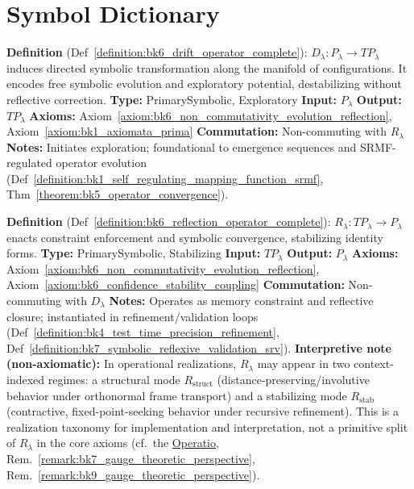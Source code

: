\clearpage
{}
\chapter{Symbol Dictionary}
\label{sec:appA_symbol_dictionary}

\begin{description}[leftmargin=2.5cm, style=nextline]

\item[\textbf{Symbolic Drift Operator} \hfill \( D_{\lambda} \)] 
\label{dict:appA_symbolic_drift_operator}
\textbf{Definition} (Def~\ref{definition:bk6_drift_operator_complete}): \( D_{\lambda} : P_\lambda \rightarrow T P_\lambda \) induces directed symbolic transformation along the manifold of configurations. It encodes free symbolic evolution and exploratory potential, destabilizing without reflective correction.
\textbf{Type:} PrimarySymbolic, Exploratory
\textbf{Input:} \( P_\lambda \)
\textbf{Output:} \( T P_\lambda \)
\textbf{Axioms:} Axiom~\ref{axiom:bk6_non_commutativity_evolution_reflection}, Axiom~\ref{axiom:bk1_axiomata_prima}
\textbf{Commutation:} Non-commuting with \( R_{\lambda} \)
\textbf{Notes:} Initiates exploration; foundational to emergence sequences and SRMF-regulated operator evolution (Def~\ref{definition:bk1_self_regulating_mapping_function_srmf}, Thm~\ref{theorem:bk5_operator_convergence}).

\item[\textbf{Symbolic Reflection Operator} \hfill \( R_{\lambda} \)] 
\label{dict:appA_symbolic_reflection_operator}
\textbf{Definition} (Def~\ref{definition:bk6_reflection_operator_complete}): \( R_{\lambda} : T P_\lambda \rightarrow P_\lambda \) enacts constraint enforcement and symbolic convergence, stabilizing identity forms.
\textbf{Type:} PrimarySymbolic, Stabilizing
\textbf{Input:} \( T P_\lambda \)
\textbf{Output:} \( P_\lambda \)
\textbf{Axioms:} Axiom~\ref{axiom:bk6_non_commutativity_evolution_reflection}, Axiom~\ref{axiom:bk6_confidence_stability_coupling}
\textbf{Commutation:} Non-commuting with \( D_{\lambda} \)
\textbf{Notes:} Operates as memory constraint and reflective closure; instantiated in refinement/validation loops (Def~\ref{definition:bk4_test_time_precision_refinement}, Def~\ref{definition:bk7_symbolic_reflexive_validation_srv}).
\textbf{Interpretive note (non-axiomatic):} In operational realizations, \( R_{\lambda} \) may appear in two context-indexed regimes: a structural mode \(R_{\mathrm{struct}}\) (distance-preserving/involutive behavior under orthonormal frame transport) and a stabilizing mode \(R_{\mathrm{stab}}\) (contractive, fixed-point-seeking behavior under recursive refinement). This is a realization taxonomy for implementation and interpretation, not a primitive split of \( R_{\lambda} \) in the core axioms (cf.~the \hyperref[sec:bk1_operatio]{Operatio}, Rem.~\ref{remark:bk7_gauge_theoretic_perspective}, Rem.~\ref{remark:bk9_gauge_theoretic_perspective}).


\end{description}
